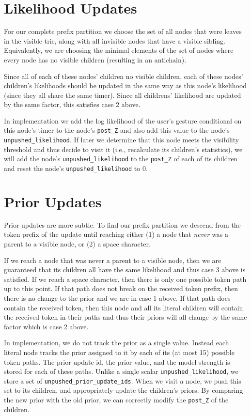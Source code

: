 \section{Likelihood Updates}
For our complete prefix partition we choose the set
of all nodes that were leaves in the visible trie,
along with all invisible nodes that have a visible sibling.
Equivalently, we are choosing the minimal elements of the set of nodes where
every node has no visible children (resulting in an antichain).

Since all of each of these nodes' children no visible children,
each of these nodes' children's likelihoods should be updated
in the same way as this node's likelihood (since they all share the same timer).
Since all childrens' likelihood are updated by the same factor,
this satisfies case 2 above.

In implementation we add the log likelihood of the user's gesture conditional on this node's timer
to the node's \texttt{post\_Z} and also add this value to the node's \texttt{unpushed\_likelihood}.
If later we determine that this node meets the visibility threshold and thus decide to visit it (i.e., recalculate its children's statistics),
we will add the node's \texttt{unpushed\_likelihood} to the \texttt{post\_Z} of each of its children
and reset the node's \texttt{unpushed\_likelihood} to 0.

\section{Prior Updates}
Prior updates are more subtle. To find our prefix partition
we descend from the token prefix of the update until reaching either (1) 
a node that \textit{never} was a parent to a visible node, or (2)
a space character.

If we reach a node that was never a parent to a visible node,
then we are guaranteed that its children all have the same likelihood
and thus case 3 above is satisfied.
If we reach a space character, then there is only one possible
token path up to this point. If that path does not break on the received token prefix,
then there is no change to the prior and we are in case 1 above. If that path
does contain the received token, then this node and all its literal children
will contain the received token in their paths and thus their 
priors will all change by the same factor which is case 2 above.

In implementation, we do not track the prior as a single value.
Instead each literal node tracks the prior assigned to it by each of its
(at most 15) possible token paths. The prior update id, the prior value, and the model strength
is stored for each of these paths. Unlike a single scalar \texttt{unpushed\_likelihood},
we store a set of \texttt{unpushed\_prior\_update\_ids}. When we visit a node,
we push this set to its children, and appropriately update the children's priors.
By comparing the new prior with the old prior, we can correctly modify the \texttt{post\_Z} of the children.

